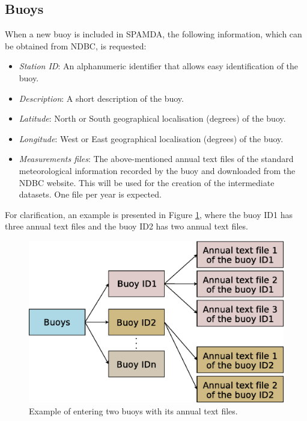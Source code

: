 \documentclass[energies,article,accept,moreauthors,pdftex]{Definitions/mdpi}
\begin{document}
\begin{paracol}{2}
\switchcolumn
\vspace{-12pt}

		
			\subsection{Buoys}\label{sec:Buoys}
			
				When a new buoy is included in SPAMDA, the following information, which can be obtained from NDBC, is requested:
				\begin{itemize}
					\item \textit{Station ID}: An alphanumeric identifier that allows easy identification of the buoy.
					\item \textit{Description}: A short description of the buoy.
					\item \textit{Latitude}: North or South geographical localisation (degrees) of the buoy.
					\item \textit{Longitude}: West or East geographical localisation (degrees) of the buoy.
					\item \textit{Measurements files}: The above-mentioned annual text files of the standard meteorological information recorded by the buoy and downloaded from the NDBC website. This will be used for the creation of the intermediate datasets. One file per year is expected.
				\end{itemize}
				
				For clarification, an example is presented in Figure \ref{fig:buoys}, where the buoy ID1 has three annual text files and the buoy ID2 has two annual text files.
				
				\begin{figure}[H]
					\includegraphics[scale=0.4]{figures/FigureBuoys.eps}
					\caption{Example of entering two buoys with its annual text files.}
					\label{fig:buoys}
				\end{figure}



\end{paracol}
\end{document}
